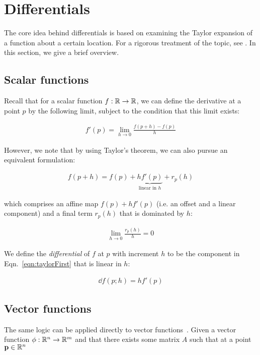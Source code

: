 \chapter{Differentials} \label{app:differentials}

The core idea behind differentials is based on examining the Taylor expansion of a function about a certain location. For a rigorous treatment of the topic, see \cite{magnus1988matrix}.  In this section, we give a brief overview.

\section{Scalar functions}

Recall that for a scalar function $f: \mathbb{R} \to \mathbb{R}$, we can define the derivative at a point $p$ by the following limit, subject to the condition that this limit exists:

\begin{align*}
  f'(p) = \lim_{h\to 0}\frac{f(p + h) - f(p)}{h} 
\end{align*}

However, we note that by using Taylor's theorem, we can also pursue an equivalent formulation:

\begin{align}
  f(p + h) = f(p) + \underbrace{h f'(p)}_{\text{linear in $h$}} + r_p(h) \label{eqn:taylorFirst}
\end{align}

which comprises an affine map $f(p) + h f'(p)$ (i.e. an offset and a linear component) and a final term $r_p(h)$ that is dominated by $h$:

\begin{align}
  \lim_{h\to 0} \frac{r_p(h)}{h} = 0
\end{align}

We define the \textit{differential} of $f$ at $p$ with increment $h$ to be the component in Eqn.~\ref{eqn:taylorFirst} that is linear in $h$:

\begin{align}
  {\dd} f (p ; h) = h f'(p)
\end{align}

\section{Vector functions}

The same logic can be applied directly to vector functions~\citep{magnus1988matrix}.  Given a vector function $\phi: \mathbb{R}^n \to \mathbb{R}^m$ and that there exists some matrix $A$ such that at a point $\mathbf{p} \in \mathbb{R}^n$

